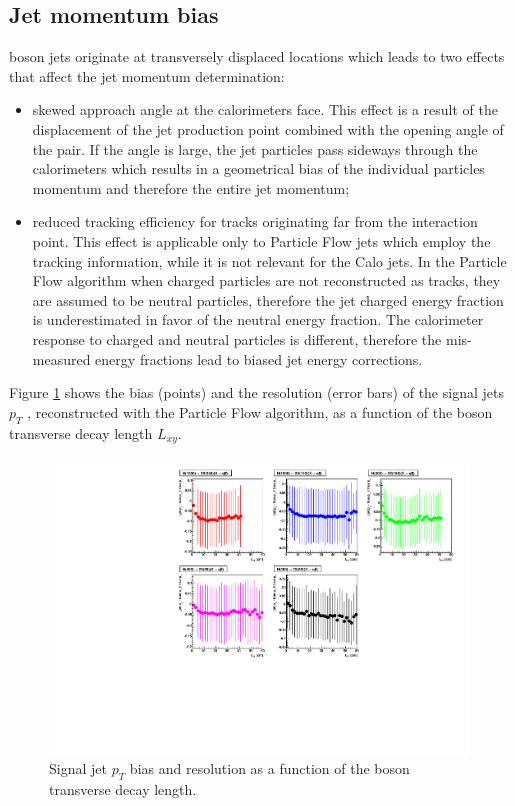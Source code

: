 \subsection{Jet momentum bias}
\label{subsec:ptbias}

\X boson jets originate at transversely displaced locations which leads to two effects that affect the jet 
momentum determination:
\begin{itemize}
 \item skewed approach angle at the calorimeters face. This effect is a result of the displacement 
of the jet production point combined with the opening angle of the \qq pair.
If the angle is large, the jet particles pass sideways through the calorimeters 
 which results in a geometrical bias of the individual
particles momentum and therefore the entire jet momentum;  
 \item reduced tracking efficiency for tracks originating far from the interaction point. This effect
is applicable only to Particle Flow jets which employ the tracking information, while it is not relevant for the 
Calo jets. In the Particle Flow algorithm when charged particles
are not reconstructed as tracks, they are assumed to be neutral particles, therefore the jet 
charged energy fraction is underestimated in favor of the neutral energy fraction. 
The calorimeter response to charged and neutral particles is different,
therefore the mis-measured energy fractions lead to biased jet energy corrections.
\end{itemize}
Figure \ref{fig:jetbias} shows the bias (points) and the resolution (error bars) of the signal jets $p_T$ 
, reconstructed with the Particle Flow algorithm, as a function of the \X boson transverse decay length $L_{xy}$.

\begin{figure}[htbp]
\centering
\includegraphics[width=0.99\textwidth]{plots/signal/biaslxy.pdf}
\caption{Signal jet $p_T$ bias and resolution as a function of the \X boson transverse decay length.\label{fig:jetbias}}
\end{figure} 
   

